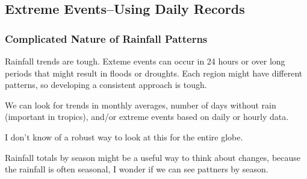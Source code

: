 \documentclass{article}
\begin{document}
\begin{knitrout}
\color{fgcolor}
\end{knitrout}


\subsection{Extreme Events--Using Daily Records}

\subsubsection{Complicated Nature of Rainfall Patterns}

Rainfall trends are tough. Exteme events can occur in 24 hours or over long periods that might result in floods or droughts. Each region might have different patterns, so developing a consistent approach is tough.

We can look for trends in monthly averages, number of days without rain (important in tropics), and/or extreme events based on daily or hourly data. 

I don't know of a robust way to look at this for the entire globe. 

\begin{knitrout}
\color{fgcolor}\begin{kframe}


{\ttfamily\noindent\bfseries\color{errorcolor}{\#\# Error in eval(m\$data, parent.frame()): object 'CHCND' not found}}

{\ttfamily\noindent\bfseries\color{errorcolor}{\#\# Error in eval(m\$data, parent.frame()): object 'CHCND' not found}}\end{kframe}
\end{knitrout}

Rainfall totals by season might be a useful way to think about changes, because the rainfall is often seasonal, I wonder if we can see pattners by season. 
\end{document}
